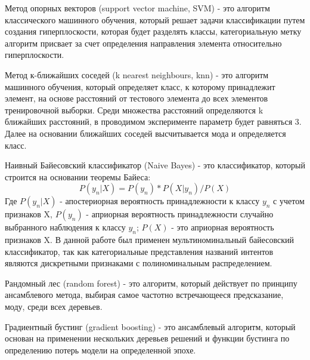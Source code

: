 \documentclass{article}
\begin{document}
Метод опорных векторов (support vector machine, SVM) - это алгоритм классического машинного обучения, который решает задачи классификации путем создания гиперплоскости, которая будет разделять классы, категориальную метку алгоритм присвает за счет определения направления элемента относительно гиперплоскости. 

Метод к-ближайших соседей (k nearest neighbours, knn) - это алгоритм машинного обучения, который определяет класс, к которому принадлежит элемент, на основе расстояний от тестового элемента до всех элементов тренировочной выборки. Среди множества расстояний определяются k ближайших расстояний, в проводимом эксперименте параметр будет равняться 3. Далее на основании ближайших соседей высчитывается мода и определяется класс.

Наивный Байесовский классификатор (Naive Bayes) - это классификатор, который строится на основании теоремы Байеса:
$$
P(y_{n}|X) = P(y_{n})* P(X|y_{n}) / P(X)
$$
Где $P(y_{n}|X)$ - апостериорная вероятность принадлежности к классу $y_{n}$ с учетом признаков X, 
$P(y_{n})$ - априорная вероятность принадлежности случайно выбранного наблюдения к классу $y_{n}$;
$P(X)$ - это априорная вероятность признаков X.
В данной работе был применен мультиноминальный байесовский классификатор, так как категориальные представления названий интентов являются дискретными признаками с полиноминальным распределением. 

Рандомный лес (random forest) - это алгоритм, который действует по принципу ансамблевого метода, выбирая самое частотно встречающееся предсказание, моду, среди всех деревьев. 

Градиентный бустинг (gradient boosting) - это ансамблевый алгоритм, который основан на применении нескольких деревьев решений и функции бустинга по определению потерь модели на определенной эпохе.
\end{document}
